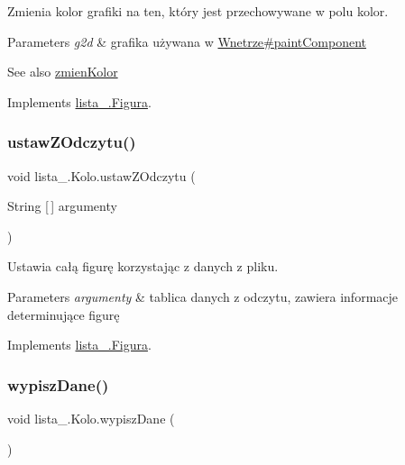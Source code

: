 Zmienia kolor grafiki na ten, który jest przechowywane w polu kolor. 
\begin{DoxyParams}{Parameters}
{\em g2d} & grafika używana w \mbox{\hyperlink{classlista__5_1_1_wnetrze_aa8676192e150a17230d72de122744a47}{Wnetrze\#paint\+Component}} \\
\hline
\end{DoxyParams}
\begin{DoxySeeAlso}{See also}
\mbox{\hyperlink{interfacelista__5_1_1_figura_aeb0982dc44348dd1fde9266d9d476ed0}{zmien\+Kolor}}
\end{DoxySeeAlso}
 

Implements \mbox{\hyperlink{interfacelista__5_1_1_figura_a3cc13bf7229b288d743be7903b3b61a4}{lista\+\_.\+Figura}}.

\mbox{\label{classlista__5_1_1_kolo_ad4c6dbc8f29699d8753272098719186e}} 
\subsubsection{\texorpdfstring{ustaw\+Z\+Odczytu()}{ustawZOdczytu()}}
{\footnotesize\ttfamily void lista\+\_.\+Kolo.\+ustaw\+Z\+Odczytu (\begin{DoxyParamCaption}\item[{String \mbox{[}$\,$\mbox{]}}]{argumenty }\end{DoxyParamCaption})}

Ustawia całą figurę korzystając z danych z pliku. 
\begin{DoxyParams}{Parameters}
{\em argumenty} & tablica danych z odczytu, zawiera informacje determinujące figurę\\
\hline
\end{DoxyParams}
 

Implements \mbox{\hyperlink{interfacelista__5_1_1_figura_a75b72b51014348d839e1f2b81525f264}{lista\+\_.\+Figura}}.

\mbox{\label{classlista__5_1_1_kolo_a9b453810cf6823d1f2549f85419aa5a7}} 
\subsubsection{\texorpdfstring{wypisz\+Dane()}{wypiszDane()}}
{\footnotesize\ttfamily void lista\+\_.\+Kolo.\+wypisz\+Dane (\begin{DoxyParamCaption}{ }\end{DoxyParamCaption})}

